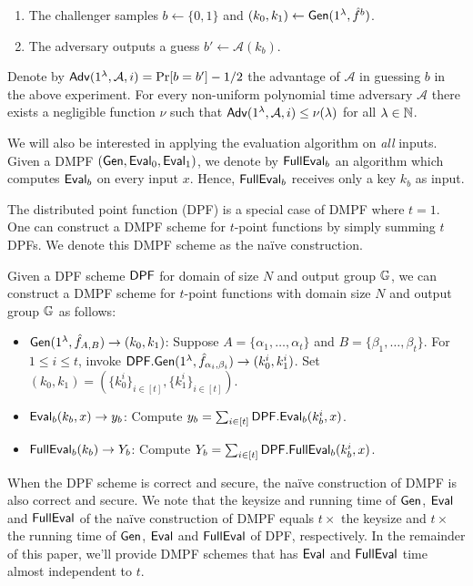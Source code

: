 \begin{definition}
\begin{itemize}
\begin{enumerate}
          \item The challenger samples $b\gets\{0,1\}$ and $(k_0,k_1)\leftarrow{\sf Gen}(1^\lambda,\hat{f}^b)$.
          \item The adversary outputs a guess $b'\leftarrow\mathcal{A}(k_b)$.
      \end{enumerate}
      Denote by ${\sf Adv}(1^\lambda,\mathcal{A},i)=\Pr[b=b']-1/2$ the advantage of $\mathcal{A}$ in guessing $b$ in the above experiment. For every non-uniform polynomial time adversary $\mathcal{A}$ there exists a negligible function $\nu$ such that ${\sf Adv}(1^\lambda,\mathcal{A},i) \le \nu(\lambda)$ for all $\lambda \in \mathbb{N}$.\fi
  \end{itemize}
  \end{definition}
 We will also be interested in applying the evaluation algorithm on \emph{all} inputs. Given a DMPF $({\sf Gen},{\sf Eval}_0,{\sf Eval}_1)$, we denote by ${\sf FullEval}_b$ an algorithm which computes ${\sf Eval}_b$ on every input $x$. Hence, ${\sf FullEval}_b$ receives only a key $k_b$ as input.

The distributed point function (DPF) is a special case of DMPF where $t=1$. 
One can construct a DMPF scheme for $t$-point functions by simply summing $t$ DPFs. We denote this DMPF scheme as the na\"ive construction. 
\begin{construction}\label{con:naive_DMPF}
  Given a DPF scheme ${\sf DPF}$ for domain of size $N$ and output group $\mathbb{G}$, we can construct a DMPF scheme for $t$-point functions with domain size $N$ and output group $\mathbb{G}$ as follows: 
  \begin{itemize}
    \item ${\sf Gen}(1^\lambda, \hat{f}_{A, B})\rightarrow (k_0, k_1)$: Suppose $A = \{\alpha_1,\dots, \alpha_t\}$ and $B = \{\beta_1,\dots, \beta_t\}$. For $1\le i\le t$, invoke ${\sf DPF}.{\sf Gen}(1^\lambda, \hat{f}_{\alpha_i, \beta_i})\rightarrow (k_0^i, k_1^i)$. Set $(k_0, k_1) = (\{k_0^i\}_{i\in [t]}, \{k_1^i\}_{i\in [t]})$. 
    \item ${\sf Eval}_b(k_b, x)\rightarrow y_b$: Compute $y_b = \sum_{i\in [t]}{\sf DPF}.{\sf Eval}_b(k_b^i, x)$. 
    \item ${\sf FullEval}_b(k_b)\rightarrow Y_b$: Compute $Y_b = \sum_{i\in [t]}{\sf DPF}.{\sf FullEval}_b(k_b^i, x)$. 
  \end{itemize}
\end{construction}
When the DPF scheme is correct and secure, the na\"ive construction of DMPF is also correct and secure. We note that the keysize and running time of ${\sf Gen}$, ${\sf Eval}$ and ${\sf FullEval}$ of the na\"ive construction of DMPF equals $t\times $ the keysize and $t\times$ the running time of ${\sf Gen}$, ${\sf Eval}$ and ${\sf FullEval}$ of DPF, respectively. In the remainder of this paper, we'll provide DMPF schemes that has ${\sf Eval}$ and ${\sf FullEval}$ time almost independent to $t$. 
 
